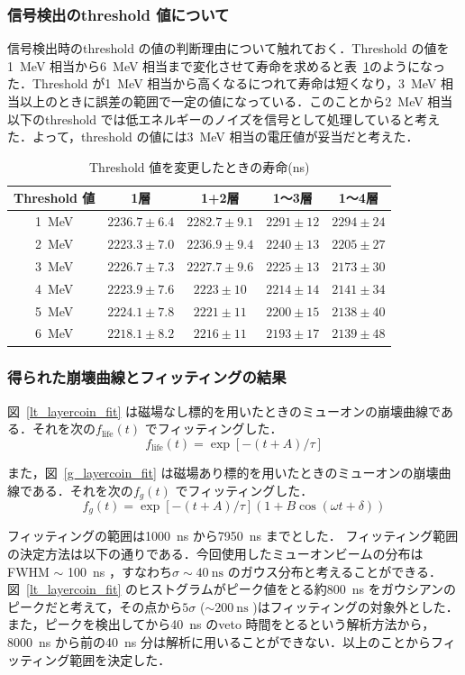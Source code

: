 \subsubsection{信号検出のthreshold 値について}
信号検出時のthreshold の値の判断理由について触れておく．Threshold の値を1~MeV 相当から6~MeV 相当まで変化させて寿命を求めると表~\ref{PS_decide_threshold}のようになった．Threshold が1~MeV 相当から高くなるにつれて寿命は短くなり，3~MeV 相当以上のときに誤差の範囲で一定の値になっている．このことから2~MeV 相当以下のthreshold では低エネルギーのノイズを信号として処理していると考えた．よって，threshold の値には3~MeV 相当の電圧値が妥当だと考えた．

\begin{table}[H]
 \caption{Threshold 値を変更したときの寿命(ns)}
 \label{PS_decide_threshold}
 \centering
 \begin{tabular}{ccccc}\toprule
  Threshold 値 & 1層 & 1+2層 & 1〜3層 & 1〜4層 \\ \hline
  1~MeV& $2236.7\pm 6.4$ & $2282.7\pm 9.1$ & $2291\pm 12$ & $2294\pm 24$ \\
  2~MeV& $2223.3\pm 7.0$ & $2236.9\pm 9.4$ & $2240\pm 13$ & $2205\pm 27$ \\
  3~MeV& $2226.7\pm 7.3$ & $2227.7\pm 9.6$ & $2225\pm 13$ & $2173\pm 30$ \\
  4~MeV& $2223.9\pm 7.6$ & $2223  \pm 10 $ & $2214\pm 14$ & $2141\pm 34$ \\
  5~MeV& $2224.1\pm 7.8$ & $2221  \pm 11 $ & $2200\pm 15$ & $2138\pm 40$ \\
  6~MeV& $2218.1\pm 8.2$ & $2216  \pm 11 $ & $2193\pm 17$ & $2139\pm 48$ \\ \bottomrule
 \end{tabular}

\end{table}

\subsubsection{得られた崩壊曲線とフィッティングの結果}
図~\ref{lt_layercoin_fit} は磁場なし標的を用いたときのミューオンの崩壊曲線である．それを次の$f_{\mathrm{life}}(t)$ でフィッティングした．
\[f_{\mathrm{life}}(t) = \exp[-(t+A)/\tau]\]

また，図~\ref{g_layercoin_fit} は磁場あり標的を用いたときのミューオンの崩壊曲線である．それを次の$f_{g}(t)$ でフィッティングした．
\[f_{g}(t) = \exp[-(t+A)/\tau](1+B\cos(\omega t + \delta))\]

  
フィッティングの範囲は1000~ns から7950~ns までとした． フィッティング範囲の決定方法は以下の通りである．今回使用したミューオンビームの分布はFWHM $\sim$ 100~ns ，すなわち$\sigma \sim 40~\mathrm{ns}$ のガウス分布と考えることができる．図~\ref{lt_layercoin_fit} のヒストグラムがピーク値をとる約800~ns をガウシアンのピークだと考えて，その点から$5\sigma$ ($\sim 200~\mathrm{ns}$ )はフィッティングの対象外とした．また，ピークを検出してから40~ns のveto 時間をとるという解析方法から，8000~ns から前の40~ns 分は解析に用いることができない．以上のことからフィッティング範囲を決定した．
  
